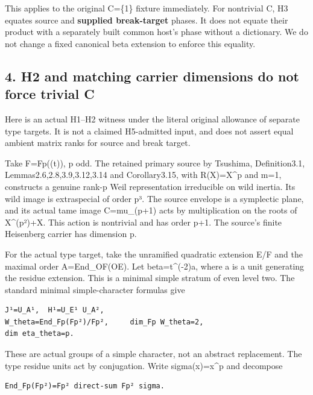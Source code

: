 This applies to the original C=\{1\} fixture immediately. For nontrivial
C, H3 equates source and \textbf{supplied break-target} phases. It does
not equate their product with a separately built common host's phase
without a dictionary. We do not change a fixed canonical beta extension
to enforce this equality.

\hypertarget{stabilizer_contract-h2-and-matching-carrier-dimensions-do-not-force-trivial-c}{%
\subsection{4. H2 and matching carrier dimensions do not force trivial
C}\label{stabilizer_contract-h2-and-matching-carrier-dimensions-do-not-force-trivial-c}}

Here is an actual H1--H2 witness under the literal original allowance of
separate type targets. It is not a claimed H5-admitted input, and does
not assert equal ambient matrix ranks for source and break target.

Take F=Fp((t)), p odd. The retained primary source by Tsushima,
Definition3.1, Lemmas2.6,2.8,3.9,3.12,3.14 and Corollary3.15, with
R(X)=X\^{}p and m=1, constructs a genuine rank-p Weil representation
irreducible on wild inertia. Its wild image is extraspecial of order p³.
The source envelope is a symplectic plane, and its actual tame image
C=mu\_(p+1) acts by multiplication on the roots of X\^{}(p²)+X. This
action is nontrivial and has order p+1. The source's finite Heisenberg
carrier has dimension p.

For the actual type target, take the unramified quadratic extension E/F
and the maximal order A=End\_OF(OE). Let beta=t\^{}(-2)a, where a is a
unit generating the residue extension. This is a minimal simple stratum
of even level two. The standard minimal simple-character formulas give

\begin{Verbatim}[fontsize=\small,breaklines=true,breakanywhere=true]
J¹=U_A¹,  H¹=U_E¹ U_A²,
W_theta=End_Fp(Fp²)/Fp²,     dim_Fp W_theta=2,
dim eta_theta=p.
\end{Verbatim}

These are actual groups of a simple character, not an abstract
replacement. The type residue units act by conjugation. Write
sigma(x)=x\^{}p and decompose

\begin{Verbatim}[fontsize=\small,breaklines=true,breakanywhere=true]
End_Fp(Fp²)=Fp² direct-sum Fp² sigma.
\end{Verbatim}

